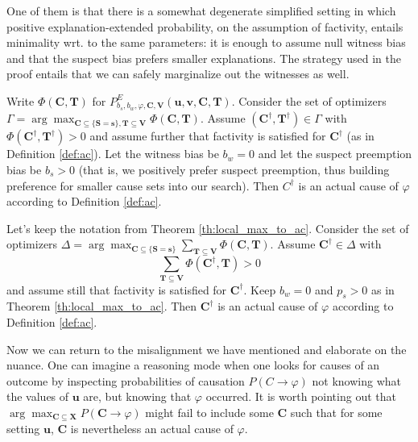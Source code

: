 \documentclass[anon,12pt]{clear2025} %
\begin{document}
One of them is that there is a somewhat degenerate simplified setting in which positive explanation-extended probability, on the assumption of factivity, entails minimality wrt. to the same parameters: it is enough to assume null witness bias and that the suspect bias prefers smaller explanations. The strategy used in the proof entails that we can safely marginalize out the witnesses as well.


\begin{theorem} \label{th:local_max_to_ac} Write $\Phi (\mathbf{C}, \mathbf{T})$ for $P^{E}_{b_s, b_w, \varphi, \mathbf{C}, \mathbf{V}}(\mathbf{u}, \mathbf{v}, \mathbf{C}, \mathbf{T})$. Consider the set of optimizers  $\Gamma = \arg\max_{\mathbf{C} \subseteq \{\mathbf{S} = \mathbf{s}\}, \mathbf{T} \subseteq \mathbf{V}} \Phi(\mathbf{C}, \mathbf{T})$.  Assume $(\mathbf{C^\dagger}, \mathbf{T^\dagger})\in \Gamma$ with $\Phi(\mathbf{C^\dagger}, \mathbf{T^\dagger})>0$ and assume further that factivity is satisfied for $\mathbf{C^\dagger}$ (as in Definition \ref{def:ac}). Let the witness bias be $b_w=0$ and let the suspect preemption bias be $b_s>0$ (that is, we positively prefer suspect preemption, thus building preference for smaller cause sets into our search). Then $C^\dagger$ is an actual cause of $\varphi$ according to Definition \ref{def:ac}.
\end{theorem}



\begin{corollary}\label{cor:marginalize} Let's keep the notation from Theorem \ref{th:local_max_to_ac}. Consider the set   of optimizers  $\Delta = \arg\max_{\mathbf{C} \subseteq \{\mathbf{S} = \mathbf{s}\}} \sum_{\mathbf{T} \subseteq \mathbf{V}} \Phi(\mathbf{C}, \mathbf{T})$.  Assume $\mathbf{C^\dagger}\in \Delta$ with \[\sum_{\mathbf{T} \subseteq \mathbf{V}} \Phi(\mathbf{C^\dagger}, \mathbf{T})>0\] and assume still that factivity is satisfied for $\mathbf{C^\dagger}$. Keep $b_w=0$ and $p_s>0$  as in Theorem \ref{th:local_max_to_ac}. Then $\mathbf{C^\dagger}$ is an actual cause of $\varphi$ according to Definition \ref{def:ac}.
\end{corollary}



Now we can return to the misalignment we have mentioned and elaborate on the nuance. One can imagine a reasoning mode when one looks for causes of an outcome by inspecting probabilities of causation $P(C \rightarrow \varphi)$ not knowing what the values of $\mathbf{u}$ are, but knowing that $\varphi$ occurred. It is worth pointing out that  $\arg\max_{\mathbf{C} \subseteq \mathbf{X}}P(\mathbf{C} \rightarrow \varphi)$ might fail to include some $\mathbf{C}$ such that for some setting $\mathbf{u}$, $\mathbf{C}$ is nevertheless an actual cause of $\varphi$.
\end{document}

